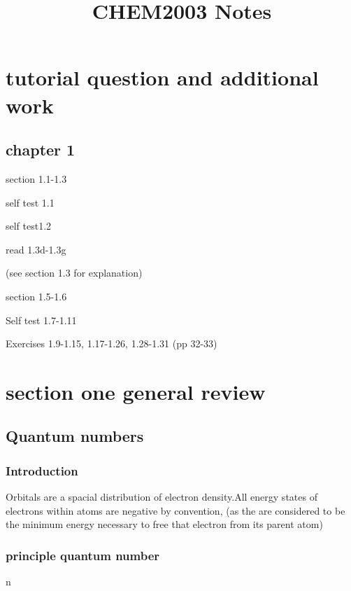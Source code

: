 \documentclass[]{article}
\title{CHEM2003 Notes}
\author{}
\date{}
\begin{document}
\maketitle

\section{tutorial question and additional
work}\label{tutorial-question-and-additional-work}

\subsection{chapter 1}\label{chapter-1}

section 1.1-1.3

self test 1.1

self test1.2

read 1.3d-1.3g

(see section 1.3 for explanation)

section 1.5-1.6

Self test 1.7-1.11

Exercises 1.9-1.15, 1.17-1.26, 1.28-1.31 (pp 32-33)

\section{section one general review}\label{section-one-general-review}

\subsection{Quantum numbers}\label{quantum-numbers}

\subsubsection{Introduction}\label{introduction}

Orbitals are a spacial distribution of electron density.All energy
states of electrons within atoms are negative by convention, (as the are
considered to be the minimum energy necessary to free that electron from
its parent atom)

\subsubsection{principle quantum number}\label{principle-quantum-number}

n
\end{document}
